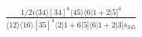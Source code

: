 \documentclass[varwidth, border=5pt]{standalone}
\begin{document}
\begin{my}
$\begin{gathered}
\scriptscriptstyle\frac{1/2i\langle34\rangle[34]^4\langle45\rangle\langle6|1+2|5]^4}{\langle12\rangle\langle16\rangle[35]^4\langle2|1+6|5]\langle6|1+2|3]s_{345}}
\end{gathered}$
\end{my}
\end{document}
